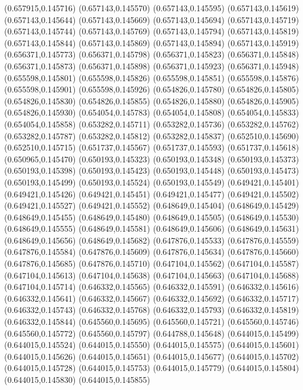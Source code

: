 (0.657915,0.145716)
(0.657143,0.145570)
(0.657143,0.145595)
(0.657143,0.145619)
(0.657143,0.145644)
(0.657143,0.145669)
(0.657143,0.145694)
(0.657143,0.145719)
(0.657143,0.145744)
(0.657143,0.145769)
(0.657143,0.145794)
(0.657143,0.145819)
(0.657143,0.145844)
(0.657143,0.145869)
(0.657143,0.145894)
(0.657143,0.145919)
(0.656371,0.145773)
(0.656371,0.145798)
(0.656371,0.145823)
(0.656371,0.145848)
(0.656371,0.145873)
(0.656371,0.145898)
(0.656371,0.145923)
(0.656371,0.145948)
(0.655598,0.145801)
(0.655598,0.145826)
(0.655598,0.145851)
(0.655598,0.145876)
(0.655598,0.145901)
(0.655598,0.145926)
(0.654826,0.145780)
(0.654826,0.145805)
(0.654826,0.145830)
(0.654826,0.145855)
(0.654826,0.145880)
(0.654826,0.145905)
(0.654826,0.145930)
(0.654054,0.145783)
(0.654054,0.145808)
(0.654054,0.145833)
(0.654054,0.145858)
(0.653282,0.145711)
(0.653282,0.145736)
(0.653282,0.145762)
(0.653282,0.145787)
(0.653282,0.145812)
(0.653282,0.145837)
(0.652510,0.145690)
(0.652510,0.145715)
(0.651737,0.145567)
(0.651737,0.145593)
(0.651737,0.145618)
(0.650965,0.145470)
(0.650193,0.145323)
(0.650193,0.145348)
(0.650193,0.145373)
(0.650193,0.145398)
(0.650193,0.145423)
(0.650193,0.145448)
(0.650193,0.145473)
(0.650193,0.145499)
(0.650193,0.145524)
(0.650193,0.145549)
(0.649421,0.145401)
(0.649421,0.145426)
(0.649421,0.145451)
(0.649421,0.145477)
(0.649421,0.145502)
(0.649421,0.145527)
(0.649421,0.145552)
(0.648649,0.145404)
(0.648649,0.145429)
(0.648649,0.145455)
(0.648649,0.145480)
(0.648649,0.145505)
(0.648649,0.145530)
(0.648649,0.145555)
(0.648649,0.145581)
(0.648649,0.145606)
(0.648649,0.145631)
(0.648649,0.145656)
(0.648649,0.145682)
(0.647876,0.145533)
(0.647876,0.145559)
(0.647876,0.145584)
(0.647876,0.145609)
(0.647876,0.145634)
(0.647876,0.145660)
(0.647876,0.145685)
(0.647876,0.145710)
(0.647104,0.145562)
(0.647104,0.145587)
(0.647104,0.145613)
(0.647104,0.145638)
(0.647104,0.145663)
(0.647104,0.145688)
(0.647104,0.145714)
(0.646332,0.145565)
(0.646332,0.145591)
(0.646332,0.145616)
(0.646332,0.145641)
(0.646332,0.145667)
(0.646332,0.145692)
(0.646332,0.145717)
(0.646332,0.145743)
(0.646332,0.145768)
(0.646332,0.145793)
(0.646332,0.145819)
(0.646332,0.145844)
(0.645560,0.145695)
(0.645560,0.145721)
(0.645560,0.145746)
(0.645560,0.145772)
(0.645560,0.145797)
(0.644788,0.145648)
(0.644015,0.145499)
(0.644015,0.145524)
(0.644015,0.145550)
(0.644015,0.145575)
(0.644015,0.145601)
(0.644015,0.145626)
(0.644015,0.145651)
(0.644015,0.145677)
(0.644015,0.145702)
(0.644015,0.145728)
(0.644015,0.145753)
(0.644015,0.145779)
(0.644015,0.145804)
(0.644015,0.145830)
(0.644015,0.145855)
